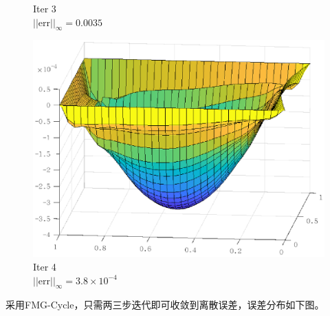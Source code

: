 \documentclass[lang=cn,10pt]{elegantbook}
\begin{document}
\begin{figure}[H]
\begin{minipage}[t]{0.24\linewidth}
    \caption*{\small Iter 3 \\ $||\text{err}||_\infty=0.0035$}
  \end{minipage}
  \begin{minipage}[t]{0.24\linewidth}
    \centering
    \includegraphics[width=0.9\linewidth]{figure/3-4-4.eps}
    \caption*{\small Iter 4 \\ $||\text{err}||_\infty=3.8\times 10^{-4}$}
  \end{minipage}
\end{figure}

采用FMG-Cycle，只需两三步迭代即可收敛到离散误差，误差分布如下图。
\end{document}
